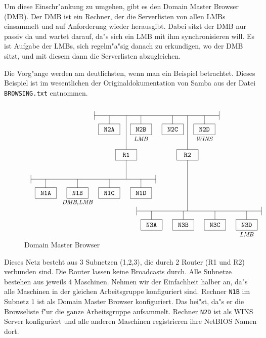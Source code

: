 \documentclass{scrartcl}
\newcommand{\datei}{\texttt}
\newcommand{\nbname}{\texttt}
\begin{document}
Um diese Einschr"ankung zu umgehen, gibt es den Domain Master Browser
(DMB). Der DMB ist ein Rechner, der die Serverlisten von allen LMBs
einsammelt und auf Anforderung wieder herausgibt. Dabei sitzt der DMB
nur passiv da und wartet darauf, da"s sich ein LMB mit ihm
synchronisieren will. Es ist Aufgabe der LMBs, sich regelm"a"sig
danach zu erkundigen, wo der DMB sitzt, und mit diesem dann die
Serverlisten abzugleichen.

Die Vorg"ange werden am deutlichsten, wenn man ein Beispiel
betrachtet. Dieses Beispiel ist im wesentlichen der
Originaldokumentation von Samba aus der Datei \datei{BROWSING.txt}
entnommen.

\newcommand{\minicomputer}[1]{%
\begin{picture}(10,9)(5,9)
\put(0,0){\framebox(10,5){{\ttfamily #1}}}
\put(5,5){\line(0,1){4}}
\end{picture}}
\newcommand{\mininetz}[1]{%
\begin{picture}(62,12)
\put(10,10){\minicomputer{N#1A}}
\put(25,10){\minicomputer{N#1B}}
\put(40,10){\minicomputer{N#1C}}
\put(55,10){\minicomputer{N#1D}}
\put(3,10){\line(1,0){59}}
\put(3,8){\line(0,1){4}}
\put(62,8){\line(0,1){4}}
\end{picture}}

\begin{figure}[ht]
\[\setlength{\unitlength}{1.1mm}
\begin{picture}(120,60)(0,5)
\put(0,20){\mininetz{1}}
\put(25,19){\makebox(0,0){\textit{{\small DMB,LMB}}}}
\put(30,50){\mininetz{2}}
\put(85,49){\makebox(0,0){\textit{{\small WINS}}}}
\put(55,49){\makebox(0,0){\textit{{\small LMB}}}}
\put(50,5){\mininetz{3}}
\put(105,4){\makebox(0,0){\textit{{\small LMB}}}}
\put(48,48){\minicomputer{R1}}
\put(48,48){\line(0,1){12}}
\put(48,39){\line(0,-1){9}}
\put(77,48){\minicomputer{R2}}
\put(77,48){\line(0,1){12}}
\put(77,39){\line(0,-1){24}}
\end{picture}\]
\caption{Domain Master Browser}
\end{figure}

Dieses Netz besteht aus 3 Subnetzen (1,2,3), die durch 2 Router (R1
und R2) verbunden sind. Die Router lassen keine Broadcasts durch. Alle
Subnetze bestehen aus jeweils 4 Maschinen.  Nehmen wir der Einfachheit
halber an, da"s alle Maschinen in der gleichen Arbeitsgruppe
konfiguriert sind. Rechner \nbname{N1B} im Subnetz 1 ist als Domain
Master Browser konfiguriert. Das hei"st, da"s er die Browseliste f"ur
die ganze Arbeitsgruppe aufsammelt. Rechner \nbname{N2D} ist als WINS
Server konfiguriert und alle anderen Maschinen registrieren ihre
NetBIOS Namen dort.
\end{document}
